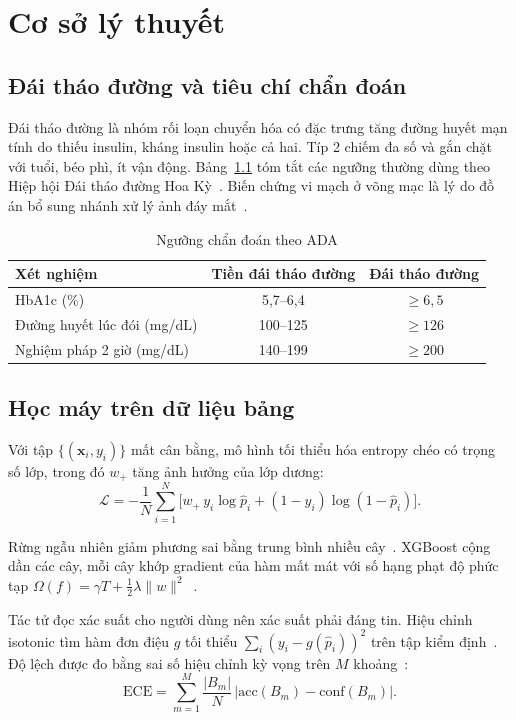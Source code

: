 \chapter{Cơ sở lý thuyết}\label{chap:lythuyet}

\section{Đái tháo đường và tiêu chí chẩn đoán}

Đái tháo đường là nhóm rối loạn chuyển hóa có đặc trưng tăng đường huyết mạn tính do thiếu insulin, kháng insulin hoặc cả hai. Típ 2 chiếm đa số và gắn chặt với tuổi, béo phì, ít vận động. Bảng~\ref{tab:ada} tóm tắt các ngưỡng thường dùng theo Hiệp hội Đái tháo đường Hoa Kỳ~\cite{ada2025}. Biến chứng vi mạch ở võng mạc là lý do đồ án bổ sung nhánh xử lý ảnh đáy mắt~\cite{gulshan}.

\begin{table}[!htbp]\centering\caption{Ngưỡng chẩn đoán theo ADA}\label{tab:ada}
\begin{tabular}{@{}lcc@{}}\toprule
\textbf{Xét nghiệm} & \textbf{Tiền đái tháo đường} & \textbf{Đái tháo đường}\\\midrule
HbA1c (\%) & 5,7--6,4 & $\ge 6{,}5$\\
Đường huyết lúc đói (mg/dL) & 100--125 & $\ge 126$\\
Nghiệm pháp 2 giờ (mg/dL) & 140--199 & $\ge 200$\\\bottomrule
\end{tabular}\end{table}

\section{Học máy trên dữ liệu bảng}

Với tập $\{(\mathbf{x}_i,y_i)\}$ mất cân bằng, mô hình tối thiểu hóa entropy chéo có trọng số lớp, trong đó $w_+$ tăng ảnh hưởng của lớp dương:
\begin{equation}
\mathcal{L}=-\frac{1}{N}\sum_{i=1}^{N}\big[w_+\,y_i\log\hat p_i+(1-y_i)\log(1-\hat p_i)\big].
\end{equation}

Rừng ngẫu nhiên giảm phương sai bằng trung bình nhiều cây~\cite{rf}. XGBoost cộng dần các cây, mỗi cây khớp gradient của hàm mất mát với số hạng phạt độ phức tạp $\Omega(f)=\gamma T+\tfrac12\lambda\|w\|^2$~\cite{xgboost}.

Tác tử đọc xác suất cho người dùng nên xác suất phải đáng tin. Hiệu chỉnh isotonic tìm hàm đơn điệu $g$ tối thiểu $\sum_i(y_i-g(\hat p_i))^2$ trên tập kiểm định~\cite{isotonic}. Độ lệch được đo bằng sai số hiệu chỉnh kỳ vọng trên $M$ khoảng~\cite{calib}:
\begin{equation}
\mathrm{ECE}=\sum_{m=1}^{M}\frac{|B_m|}{N}\,\big|\mathrm{acc}(B_m)-\mathrm{conf}(B_m)\big|.
\end{equation}

